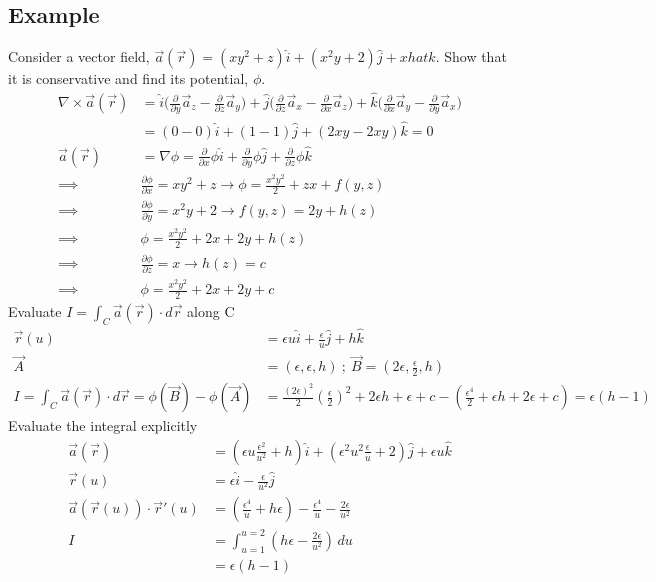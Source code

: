 \documentclass[a4paper, 11pt, normalem]{report}
\newcommand\p{\partial}
\newcommand\veca{\vec{a}(\vec{r})}
\newcommand\veru{\vec{r}(u)}
\begin{document}
\subsection{Example}
Consider a vector field, $\veca = (xy^2 + z)\hat{i} + (x^2 y + 2)\hat{j} + xhat{k}$. Show that it is conservative and find its potential, $\phi$.
\begin{align*}
    \nabla \times \veca &= \hat{i}\Big(\frac{\p}{\p y}\vec{a}_z - \frac{\p}{\p z}\vec{a}_y\Big) + \hat{j}\Big(\frac{\p}{\p z}\vec{a}_x - \frac{\p}{\p x}\vec{a}_z\Big) + \hat{k}\Big(\frac{\p}{\p x}\vec{a}_y - \frac{\p}{\p y}\vec{a}_x\Big) \\
    &= (0 - 0)\hat{i} + (1 - 1)\hat{j} + (2xy - 2xy)\hat{k} = 0 \\
    \veca &= \nabla \phi = \frac{\p }{\p x}\phi \hat{i} + \frac{\p}{\p y}\phi \hat{j} + \frac{\p}{\p z}\phi \hat{k} \\
    \implies &\frac{\p \phi}{\p x} = xy^2 + z \to \phi = \frac{x^2y^2}{2} + zx + f(y,z) \\
    \implies &\frac{\p \phi}{\p y} = x^2y + 2 \to f(y,z) = 2y + h(z) \\
    \implies &\phi = \frac{x^2y^2}{2} + 2x + 2y + h(z) \\
    \implies &\frac{\p \phi}{\p z} = x \to h(z) = c \\
    \implies &\phi = \frac{x^2y^2}{2} + 2x + 2y + c
\end{align*}
Evaluate $I = \int_C \veca \cdot d\vec{r}$ along C
\begin{align*}
    \veru &= \epsilon u \hat{i} + \frac{\epsilon}{u}\hat{j} + h\hat{k} \\
    \vec{A} &= (\epsilon, \epsilon, h) ~;~ \vec{B} = (2\epsilon, \frac{\epsilon}{2}, h) \\
    I = \int_C \veca \cdot d\vec{r} = \phi(\vec{B}) - \phi(\vec{A}) &= \frac{(2\epsilon)^2}{2}(\frac{\epsilon}{2})^2 + 2\epsilon h + \epsilon + c - (\frac{\epsilon^4}{2} + \epsilon h + 2\epsilon + c) = \epsilon (h - 1)
\end{align*}
Evaluate the integral explicitly
\begin{align*}
    \veca &= (\epsilon u\frac{\epsilon^2}{u^2} + h)\hat{i} + (\epsilon^2 u^2 \frac{\epsilon}{u} + 2)\hat{j} + \epsilon u \hat{k} \\
    \veru &= \epsilon \hat{i} - \frac{\epsilon}{u^2}\hat{j} \\
    \vec{a}(\veru) \cdot \vec{r}'(u) &= (\frac{\epsilon^4}{u} + h\epsilon) - \frac{\epsilon^4}{u} - \frac{2\epsilon}{u^2} \\
    I &= \int_{u = 1}^{u = 2} (h\epsilon - \frac{2\epsilon}{u^2})\, du \\
    &= \epsilon (h - 1)
\end{align*}
\end{document}

